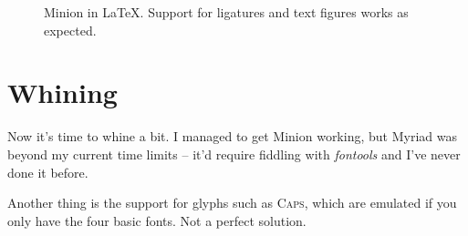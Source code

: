 \documentclass[10pt]{article}
\begin{document}
\begin{figure}[p]
\centering%
\caption{Minion in \LaTeX{}. Support for ligatures and text figures works as expected.}\label{fig:minion}
\end{figure}

\section{Whining}

Now it's time to whine a bit. I managed to get Minion working, but Myriad was beyond my current
time limits -- it'd require fiddling with \emph{fontools} and I've never done it before.

Another thing is the support for glyphs such as \textsc{Caps}, which are emulated if you only
have the four basic fonts. Not a perfect solution. 
\end{document}
